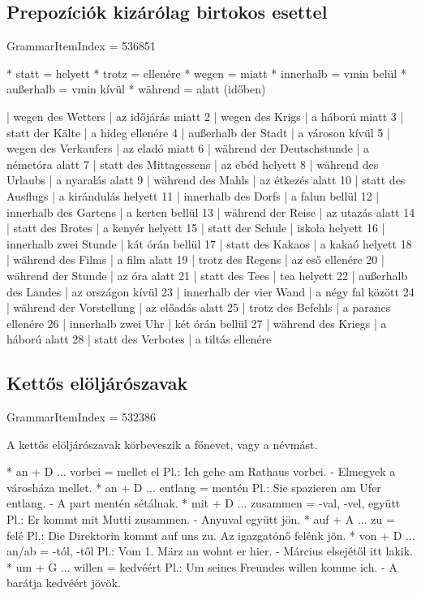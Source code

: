 \documentclass{article}
\newenvironment{desc}{\verbatim}{\endverbatim}
\newenvironment{exmp}{\verbatim}{\endverbatim}
\begin{document}
\subsection{Prepozíciók kizárólag birtokos esettel}

GrammarItemIndex = 536851

\begin{desc}
* statt = helyett
* trotz = ellenére
* wegen = miatt
* innerhalb = vmin belül
* außerhalb = vmin kívül
* während = alatt (időben)
\end{desc}

\begin{exmp}
1 | wegen des Wetters | az időjárás miatt
2 | wegen des Krigs | a háború miatt
3 | statt der Kälte | a hideg ellenére
4 | außerhalb der Stadt | a városon kívül
5 | wegen des Verkaufers | az eladó miatt
6 | während der Deutschstunde | a németóra alatt
7 | statt des Mittagessens | az ebéd helyett
8 | während des Urlaubs | a nyaralás alatt
9 | während des Mahls | az étkezés alatt
10 | statt des Ausflugs | a kirándulás helyett
11 | innerhalb des Dorfs | a falun bellül
12 | innerhalb des Gartens | a kerten bellül
13 | während der Reise | az utazás alatt
14 | statt des Brotes | a kenyér helyett
15 | statt der Schule | iskola helyett
16 | innerhalb zwei Stunde | kát órán bellül
17 | statt des Kakaos | a kakaó helyett
18 | während des Films | a film alatt
19 | trotz des Regens | az eső ellenére
20 | während der Stunde | az óra alatt
21 | statt des Tees | tea helyett
22 | außerhalb des Landes | az országon kívül
23 | innerhalb der vier Wand | a négy fal között
24 | während der Vorstellung | az előadás alatt
25 | trotz des Befehls | a parancs ellenére
26 | innerhalb zwei Uhr | két órán bellül
27 | während des Kriegs | a háború alatt
28 | statt des Verbotes | a tiltás ellenére
\end{exmp}

\subsection{Kettős elöljárószavak}

GrammarItemIndex = 532386

\begin{desc}
A kettős elöljárószavak körbeveszik a főnevet, vagy a névmást.

* an + D ... vorbei = mellet el
  Pl.: Ich gehe am Rathaus vorbei. - Elmegyek a városháza mellet.
* an + D ... entlang = mentén
  Pl.: Sie spazieren am Ufer entlang. - A part mentén sétálnak.
* mit + D ... zusammen = -val, -vel, együtt
  Pl.: Er kommt mit Mutti zusammen. - Anyuval együtt jön.
* auf + A ... zu = felé
  Pl.: Die Direktorin kommt auf uns zu. Az igazgatónő felénk jön.
* von + D ... an/ab = -tól, -től
  Pl.: Vom 1. März an wohnt er hier. - Március elsejétől itt lakik.
* um + G ... willen = kedvéért
  Pl.: Um seines Freundes willen komme ich. - A barátja kedvéért jövök. 
\end{desc}
\end{document}
